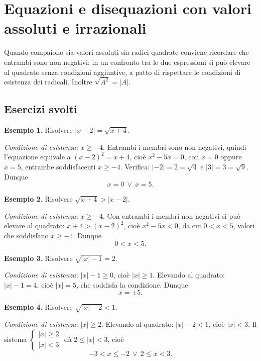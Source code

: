 \documentclass[12pt,a4paper,openany]{book}
\theoremstyle{definition}
\newtheorem{esempio}{Esempio}[section]
\theoremstyle{plain}
\theoremstyle{remark}
\newcommand{\abs}[1]{\left|#1\right|}
\newcommand{\sistema}[1]{\begin{cases}#1\end{cases}}
\begin{document}
\section{Equazioni e disequazioni con valori assoluti e irrazionali}

Quando compaiono sia valori assoluti sia radici quadrate conviene ricordare che entrambi sono non negativi: in un confronto tra le due espressioni si può elevare al quadrato senza condizioni aggiuntive, a patto di rispettare le condizioni di esistenza dei radicali. Inoltre $\sqrt{A^2}=\abs{A}$.

\subsection*{Esercizi svolti}

\begin{esempio}
Risolvere $\abs{x-2}=\sqrt{x+4}$.

\emph{Condizione di esistenza:} $x\ge -4$. Entrambi i membri sono non negativi, quindi l'equazione equivale a $(x-2)^2=x+4$, cioè $x^2-5x=0$, con $x=0$ oppure $x=5$, entrambe soddisfacenti $x\ge -4$. Verifica: $\abs{-2}=2=\sqrt4$ e $\abs{3}=3=\sqrt9$. Dunque
\[
x=0\ \lor\ x=5.
\]
\end{esempio}

\begin{esempio}
Risolvere $\sqrt{x+4}>\abs{x-2}$.

\emph{Condizione di esistenza:} $x\ge -4$. Con entrambi i membri non negativi si può elevare al quadrato: $x+4>(x-2)^2$, cioè $x^2-5x<0$, da cui $0<x<5$, valori che soddisfano $x\ge -4$. Dunque
\[
0<x<5.
\]
\end{esempio}

\begin{esempio}
Risolvere $\sqrt{\abs{x}-1}=2$.

\emph{Condizione di esistenza:} $\abs{x}-1\ge 0$, cioè $\abs{x}\ge 1$. Elevando al quadrato: $\abs{x}-1=4$, cioè $\abs{x}=5$, che soddisfa la condizione. Dunque
\[
x=\pm 5.
\]
\end{esempio}

\begin{esempio}
Risolvere $\sqrt{\abs{x}-2}<1$.

\emph{Condizione di esistenza:} $\abs{x}\ge 2$. Elevando al quadrato: $\abs{x}-2<1$, cioè $\abs{x}<3$. Il sistema $\sistema{\abs{x}\ge 2\\ \abs{x}<3}$ dà $2\le\abs{x}<3$, cioè
\[
-3<x\le -2\ \lor\ 2\le x<3.
\]
\end{esempio}
\end{document}
